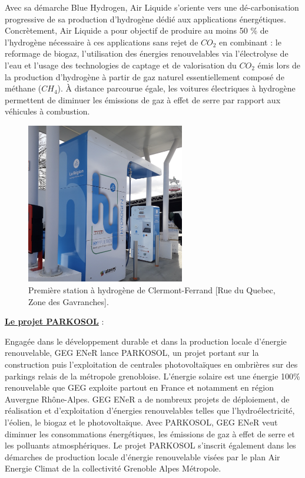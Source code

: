 Avec sa démarche Blue Hydrogen, Air Liquide s'oriente vers une dé-carbonisation progressive de sa production d'hydrogène dédié aux applications énergétiques.
Concrètement, Air Liquide a pour objectif de produire au moins 50 \% de l'hydrogène nécessaire à ces applications sans rejet de $CO_2$ en combinant :
le reformage de biogaz, 
l'utilisation des énergies renouvelables via l'électrolyse de l'eau et l'usage des technologies de captage et de valorisation du $CO_2$ émis lors de la production d'hydrogène à partir de gaz naturel essentiellement composé de méthane ($CH_4$). \`{A} distance parcourue égale, les voitures électriques à hydrogène permettent de diminuer les émissions de gaz à effet de serre par rapport aux véhicules à combustion.
\begin{figure}[H]
	\centerline{
		\includegraphics[height=7cm]{images_these/station_h2.png}}
	\caption[Première station à hydrogène de Clermont-Ferrand]{ Première station à hydrogène de Clermont-Ferrand [Rue du Quebec, Zone des Gavranches].}
	\label{station_h2}
\end{figure}


\underline{\textbf{Le projet PARKOSOL}} :

 Engagée dans le développement durable et dans la production locale d'énergie renouvelable, GEG ENeR lance PARKOSOL, un projet portant sur la construction puis l'exploitation de centrales photovoltaïques en ombrières sur des parkings relais de la métropole grenobloise.
L'énergie solaire est une énergie 100\% renouvelable que GEG exploite partout en France et notamment en région Auvergne Rhône-Alpes. GEG ENeR a de nombreux projets de déploiement, de réalisation et d'exploitation d'énergies renouvelables telles que l'hydroélectricité, l'éolien, le biogaz et le photovoltaïque.
Avec PARKOSOL, GEG ENeR veut diminuer les consommations énergétiques, les émissions de gaz à effet de serre et les polluants atmosphériques. Le projet PARKOSOL s'inscrit également dans les démarches de production locale d'énergie renouvelable visées par le plan Air Energie Climat de la collectivité Grenoble Alpes Métropole.

